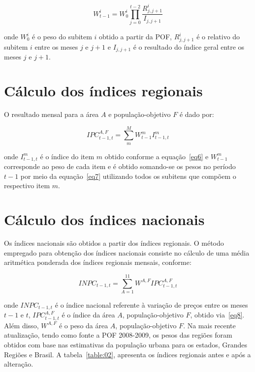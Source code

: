 \documentclass[twoside,a4paper,11pt]{report}
\begin{document}
{\begin{equation}\label{eq7}
{W}_{t-1}^{i}={W}_{0}^{i}\prod_{j=0}^{t-2}{\frac{{R}_{j,j+1}^{i}}{{I}_{j,j+1}}} 
\end{equation}

\noindent onde ${W}_{0}^{i}$ é o peso do subitem $i$ obtido a partir da POF, ${R}_{j,j+1}^{i}$ é o relativo do subitem $i$ entre os meses $j$ e $j+1$ e ${I}_{j,j+1}$ é o resultado do índice geral entre os meses $j$ e $j+1$.

\section*{Cálculo dos índices regionais}

O resultado mensal para a área $A$ e população-objetivo $F$ é dado por:

\begin{equation}\label{eq8}
{IPC}_{t-1,t}^{A,F}=\sum_{m}^{M}{{W}_{t-1}^{m}{I}_{t-1,t}^{m}} 
\end{equation}

\noindent onde ${I}_{t-1,t}^{m}$ é o índice do item $m$ obtido conforme a equação~\ref{eq6} e ${W}_{t-1}^{m}$ corresponde ao peso de cada item e é obtido somando-se os pesos no período $t-1$ por meio da equação~\ref{eq7} utilizando todos os subitens que compõem o respectivo item $m$.

\section*{Cálculo dos índices nacionais}

Os índices nacionais são obtidos a partir dos índices regionais. O método empregado para obtenção dos índices nacionais consiste no cálculo de uma média aritmética ponderada dos índices regionais mensais, conforme:

\begin{equation}\label{eq9}
{INPC}_{t-1,t}=\sum_{A=1}^{11}{{W}^{A,F}{IPC}_{t-1,t}^{A,F}}
\end{equation}

\noindent onde ${INPC}_{t-1,t}$ é o índice nacional referente à variação de preços entre os meses $t-1$ e $t$, ${IPC}_{t-1,t}^{A,F}$ é o índice da área $A$, população-objetivo $F$, obtido via~\ref{eq8}. Além disso, ${W}^{A,F}$ é o peso da área $A$, população-objetivo $F$. Na mais recente atualização, tendo como fonte a POF 2008-2009, os pesos das regiões foram obtidos com base nas estimativas da população urbana para os estados, Grandes Regiões e Brasil. A tabela~\ref{table:02}, apresenta os índices regionais antes e após a alteração. 

}
\end{document}
